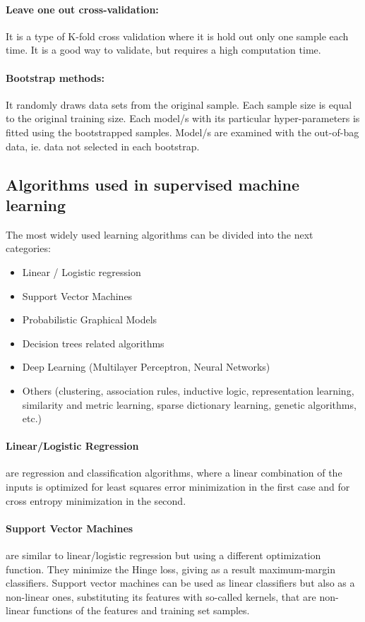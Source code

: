 \paragraph{Leave one out cross-validation:} It is a type of K-fold cross validation where it is hold out only one sample each time. It is a good way to validate, but requires a high computation time.

\paragraph{Bootstrap methods:} It randomly draws data sets from the original sample. Each sample size is equal to the original training size. Each model/s with its particular hyper-parameters is fitted using the bootstrapped samples. Model/s are examined with the out-of-bag data, ie. data not selected in each bootstrap.

\subsection{Algorithms used in supervised machine learning}

The most widely used learning algorithms can be divided into the next categories:

\begin{itemize}
\item Linear / Logistic regression
\item Support Vector Machines
\item Probabilistic Graphical Models
\item Decision trees related algorithms
\item Deep Learning (Multilayer Perceptron, Neural Networks)
\item Others (clustering, association rules, inductive logic, representation learning, similarity and metric learning, sparse dictionary learning, genetic algorithms, etc.)
\end{itemize}

\paragraph{Linear/Logistic Regression} are regression and classification algorithms, where a linear combination of the inputs is optimized for least squares error minimization in the first case and for cross entropy minimization in the second.

\paragraph{Support Vector Machines} are similar to linear/logistic regression but using a different optimization function. They minimize the Hinge loss, giving as a result maximum-margin classifiers. Support vector machines can be used as linear classifiers but also as a non-linear ones, substituting its features with so-called kernels, that are non-linear functions of the features and training set samples. 

